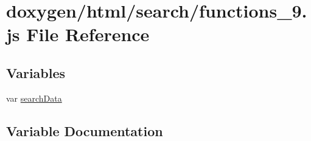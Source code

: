 \hypertarget{a00092}{}\section{doxygen/html/search/functions\+\_\+9.js File Reference}
\label{a00092}
\subsection*{Variables}
\begin{DoxyCompactItemize}
\item 
var \hyperlink{a00092_ad01a7523f103d6242ef9b0451861231e}{search\+Data}
\end{DoxyCompactItemize}


\subsection{Variable Documentation}
\hypertarget{a00092_ad01a7523f103d6242ef9b0451861231e}{}
